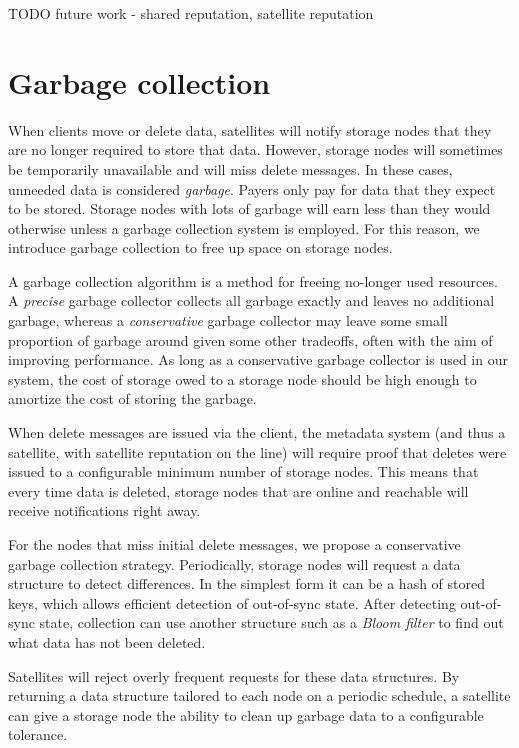 \documentclass[11pt,fleqn,openany]{book}
\newcommand{\todo}[1]{{\color{red} TODO #1 }}
\begin{document}
\todo{future work - shared reputation, satellite reputation}

\section{Garbage collection}\label{sec:garbage-collection}

When clients move or delete data, satellites will notify storage nodes
that they are no longer required to store that data. However,
storage nodes will sometimes be temporarily unavailable and will miss delete
messages. In these cases, unneeded data is considered
{\em garbage}. Payers only pay for data that they expect to be stored. Storage
nodes with lots of garbage will earn less than they would
otherwise unless a garbage collection system is employed. For this reason, we
introduce garbage collection to free up space on storage nodes.

A garbage collection algorithm is a method for freeing no-longer used resources.
A {\em precise} garbage collector collects all garbage exactly and
leaves no additional garbage, whereas a {\em conservative} garbage collector may
leave some small proportion of garbage around given some other tradeoffs,
often with the aim of improving performance.
As long as a conservative garbage collector is used in our system, the cost of
storage owed to a storage node should be high enough to amortize the cost of
storing the garbage.

When delete messages are issued via the client, the metadata system (and thus a
satellite, with satellite reputation on the line) will require proof that
deletes were issued to a configurable minimum number of storage nodes.
This means that every time
data is deleted, storage nodes that are online and reachable will receive
notifications right away.

For the nodes that miss initial delete messages, we propose a conservative
garbage collection strategy. Periodically, storage nodes will request
a data structure to detect differences. In the simplest form it can be a hash
of stored keys, which allows efficient detection of out-of-sync state. After
detecting out-of-sync state, collection can use another structure such as a
{\em Bloom filter} \cite{bloom-filter} to find out what data has not been
deleted.

Satellites will reject overly frequent requests for these data structures.
By returning a data
structure tailored to each node on a periodic schedule, a satellite can give a
storage node the ability to clean up garbage data to a configurable tolerance.
\end{document}
